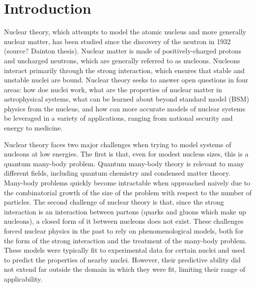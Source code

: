 \chapter{Introduction}



Nuclear theory, which attempts to model the atomic nucleus and more generally nuclear matter, has been studied since the discovery of the neutron in 1932 (source? Dainton thesis). Nuclear matter is made of positively-charged protons and uncharged neutrons, which are generally referred to as nucleons. Nucleons interact primarily through the strong interaction, which ensures that stable and unstable nuclei are bound. Nuclear theory seeks to answer open questions in four areas: how doe nuclei work, what are the properties of nuclear matter in astrophysical systems, what can be learned about beyond standard model (BSM) physics from the nucleus, and how can more accurate models of nuclear systems be leveraged in a variety of applications, ranging from national security and energy to medicine.

Nuclear theory faces two major challenges when trying to model systems of nucleons at low energies. The first is that, even for modest nucleus sizes, this is a quantum many-body problem. Quantum many-body theory is relevant to many different fields, including quantum chemistry and condensed matter theory. Many-body problems quickly become intractable when approached naively due to the combinatorial growth of the size of the problem with respect to the number of particles. The second challenge of nuclear theory is that, since the strong interaction is an interaction between partons (quarks and gluons which make up nucleons), a closed form of it between nucleons does not exist. These challenges forced nuclear physics in the past to rely on phenomenological models, both for the form of the strong interaction and the treatment of the many-body problem. These models were typically fit to experimental data for certain nuclei and used to predict the properties of nearby nuclei. However, their predictive ability did not extend far outside the domain in which they were fit, limiting their range of applicability.

